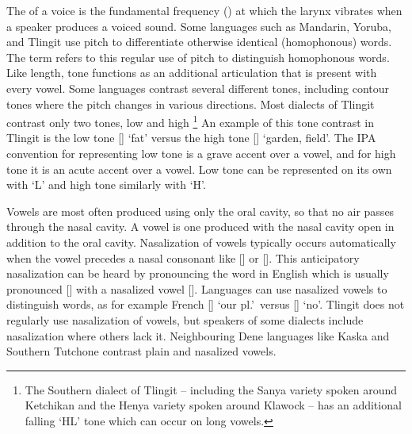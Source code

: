 The  of a voice is the fundamental frequency (\!\Fzero) at which the larynx vibrates when a speaker produces a voiced sound.
Some languages such as Mandarin, Yoruba, and Tlingit use pitch to differentiate otherwise identical (homophonous) words.
The term  refers to this regular use of pitch to distinguish homophonous words.
Like length, tone functions as an additional articulation that is present with every vowel.
Some languages contrast several different tones, including contour tones where the pitch changes in various directions.
Most dialects of Tlingit contrast only two tones, low and high%
\footnote{The Southern dialect of Tlingit – including the Sanya variety spoken around Ketchikan and the Henya variety spoken around Klawock – has an additional falling ‘HL’ tone which can occur on long vowels.}
An example of this tone contrast in Tlingit is the low tone  [] ‘fat’ versus the high tone  [] ‘garden, field’.
The IPA convention for representing low tone is a grave accent  over a vowel, and for high tone it is an acute accent  over a vowel.
Low tone can be represented on its own with ‘L’ and high tone similarly with ‘H’.

Vowels are most often produced using only the oral cavity, so that no air passes through the nasal cavity.
A  vowel is one produced with the nasal cavity open in addition to the oral cavity.
Nasalization of vowels typically occurs automatically when the vowel precedes a nasal consonant like [] or [].
This anticipatory nasalization can be heard by pronouncing the word  in English which is usually pronounced [] with a nasalized vowel []. Languages can use nasalized vowels to distinguish words, as for example French  [] ‘our pl.’\ versus  [] ‘no’.
Tlingit does not regularly use nasalization of vowels, but speakers of some dialects include nasalization where others lack it.
Neighbouring Dene languages like Kaska and Southern Tutchone contrast plain and nasalized vowels.

